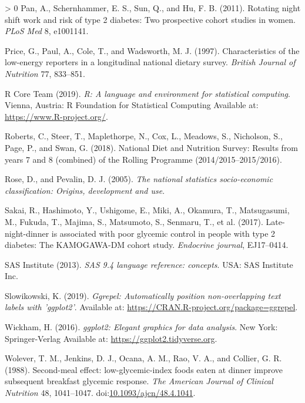 \documentclass[utf8]{frontiersSCNS}
\newlength{\cslhangindent}
\newenvironment{CSLReferences}[3] %
 {%
  \setlength{\parindent}{0pt}
  \ifodd #1 \everypar{\setlength{\hangindent}{\cslhangindent}}\ignorespaces\fi
  \ifnum #2 > 0
  \setlength{\parskip}{#2\baselineskip}
  \fi
 }%
 {}
\begin{document}
\begin{CSLReferences}{1}{0}
\leavevmode\hypertarget{ref-pan2011rotating}{}%
Pan, A., Schernhammer, E. S., Sun, Q., and Hu, F. B. (2011). Rotating
night shift work and risk of type 2 diabetes: Two prospective cohort
studies in women. \emph{PLoS Med} 8, e1001141.

\leavevmode\hypertarget{ref-price1997characteristics}{}%
Price, G., Paul, A., Cole, T., and Wadsworth, M. J. (1997).
Characteristics of the low-energy reporters in a longitudinal national
dietary survey. \emph{British Journal of Nutrition} 77, 833--851.

\leavevmode\hypertarget{ref-Rcoreteam}{}%
R Core Team (2019). \emph{R: A language and environment for statistical
computing}. Vienna, Austria: R Foundation for Statistical Computing
Available at: \url{https://www.R-project.org/}.

\leavevmode\hypertarget{ref-roberts2018national}{}%
Roberts, C., Steer, T., Maplethorpe, N., Cox, L., Meadows, S.,
Nicholson, S., Page, P., and Swan, G. (2018). National {D}iet and
{N}utrition {S}urvey: Results from years 7 and 8 (combined) of the
{R}olling {P}rogramme (2014/2015--2015/2016).

\leavevmode\hypertarget{ref-rose2005national}{}%
Rose, D., and Pevalin, D. J. (2005). \emph{The national statistics
socio-economic classification: Origins, development and use}.

\leavevmode\hypertarget{ref-sakai2017late}{}%
Sakai, R., Hashimoto, Y., Ushigome, E., Miki, A., Okamura, T.,
Matsugasumi, M., Fukuda, T., Majima, S., Matsumoto, S., Senmaru, T., et
al. (2017). Late-night-dinner is associated with poor glycemic control
in people with type 2 diabetes: The KAMOGAWA-DM cohort study.
\emph{Endocrine journal}, EJ17--0414.

\leavevmode\hypertarget{ref-SAS94}{}%
SAS Institute (2013). \emph{SAS 9.4 language reference: concepts}. USA:
SAS Institute Inc.

\leavevmode\hypertarget{ref-ggrepel}{}%
Slowikowski, K. (2019). \emph{Ggrepel: Automatically position
non-overlapping text labels with 'ggplot2'}. Available at:
\url{https://CRAN.R-project.org/package=ggrepel}.

\leavevmode\hypertarget{ref-ggplot2}{}%
Wickham, H. (2016). \emph{ggplot2: Elegant graphics for data analysis}.
New York: Springer-Verlag Available at:
\url{https://ggplot2.tidyverse.org}.

\leavevmode\hypertarget{ref-Wolever1988}{}%
Wolever, T. M., Jenkins, D. J., Ocana, A. M., Rao, V. A., and Collier,
G. R. (1988). {Second-meal effect: low-glycemic-index foods eaten at
dinner improve subsequent breakfast glycemic response}. \emph{The
American Journal of Clinical Nutrition} 48, 1041--1047.
doi:\href{https://doi.org/10.1093/ajcn/48.4.1041}{10.1093/ajcn/48.4.1041}.


\end{CSLReferences}
\end{document}
